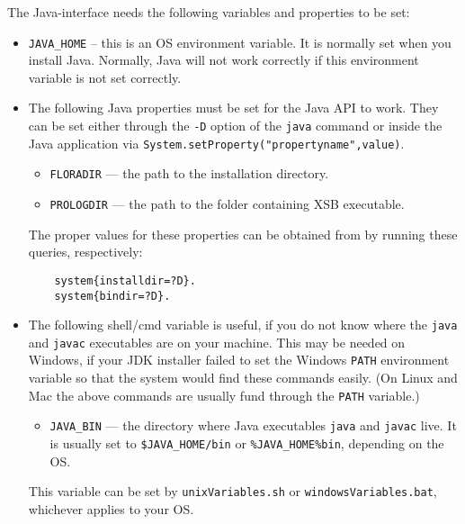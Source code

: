 The Java-\FLSYSTEM interface needs the following variables and properties
to be set:
\begin{itemize}
\item  \texttt{JAVA\_HOME} -- this is an OS environment variable.
  It is normally set when you install Java. Normally, Java will not work
  correctly if this environment variable is not set correctly.
\item  The following Java properties must be set for the Java API to work.
  They can be set either through the
  \texttt{-D} option of the \texttt{java} command or inside the Java
  application via \texttt{System.setProperty("propertyname",value)}.  
  \begin{itemize}
  \item  \texttt{FLORADIR} --- the path to the \FLSYSTEM installation directory.
  \item  \texttt{PROLOGDIR} --- the path to the folder containing XSB executable.
  \end{itemize}
  The proper values for these properties can be obtained from \FLSYSTEM by
  running these queries, respectively:
\begin{verbatim}
    system{installdir=?D}.  
    system{bindir=?D}.  
\end{verbatim}
\item The following shell/cmd variable is useful, if you do not know where
  the \texttt{java} and \texttt{javac} executables are on your machine.
  This may be needed on Windows, if your JDK installer failed to set the
  Windows \texttt{PATH} environment variable so that the system would find
  these commands easily. (On Linux and Mac the above commands
  are usually fund through the \texttt{PATH} variable.)
  \begin{itemize}
  \item   \texttt{JAVA\_BIN} --- the directory where Java executables
    \texttt{java}  and \texttt{javac}  live. It is usually set to \texttt{\$JAVA\_HOME/bin} or
    \texttt{\%JAVA\_HOME\%\bs{}bin}, depending on the OS. 
  \end{itemize}
  This variable can be set by
  \texttt{unixVariables.sh} or \texttt{windowsVariables.bat}, whichever
  applies to your OS.
\end{itemize}

